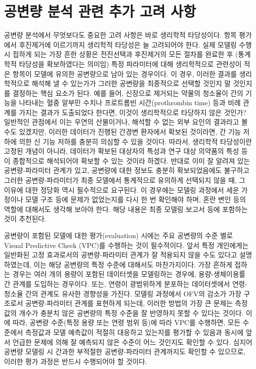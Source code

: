 \documentclass[
  10pt,
  krantz2,
  a4paper]{krantz}
\theoremstyle{definition}
\theoremstyle{definition}
\theoremstyle{definition}
\theoremstyle{remark}
\begin{document}
\hypertarget{uxacf5uxbcc0uxb7c9-uxbd84uxc11d-uxad00uxb828-uxcd94uxac00-uxace0uxb824-uxc0acuxd56d}{%
\section{공변량 분석 관련 추가 고려 사항}\label{uxacf5uxbcc0uxb7c9-uxbd84uxc11d-uxad00uxb828-uxcd94uxac00-uxace0uxb824-uxc0acuxd56d}}

공변량 분석에서 무엇보다도 중요한 고려 사항은 바로 생리학적 타당성이다. 항목 평가에서 후진제거에 이르기까지 생리학적 타당성은 늘 고려되어야 한다. 실제 모델링 수행 시 접하게 되는 가장 흔한 상황은 전진선택과 후진제거의 모든 절차를 완료한 후 (통계학적 타당성을 확보하였다는 의미임) 특정 파라미터에 대해 생리학적으로 관련성이 적은 항목이 모델에 유의한 공변량으로 남아 있는 경우이다. 이 경우, 이러한 결과를 생리학적으로 해석해 낼 수 있는가가 그러한 공변량을 최종적으로 선택할 것인지 말 것인지를 결정하는 핵심 요소가 된다. 예를 들어, 신장으로 제거되는 약물의 청소율이 간의 기능을 나타내는 혈중 알부민 수치나 프로트롬빈 시간(prothrombin time) 등과 비례 관계를 가지는 결과가 도출되었다 한다면, 이것이 생리학적으로 타당하지 않은 것인가? 일반적인 관점에서 이는 우연의 산물이거나, 해석할 수 없는 외부 요인의 결과라고 볼 수도 있겠지만, 이러한 데이터가 진행된 간경변 환자에서 확보된 것이라면, 간 기능 저하에 의한 신 기능 저하를 충분히 의심할 수 있을 것이다. 따라서, 생리학적 타당성이란 고정된 개념이 아니라, 데이터가 확보된 대상자의 특성과 연구 대상 의약품의 특성 등이 종합적으로 해석되어야 확보할 수 있는 것이라 하겠다. 반대로 이미 잘 알려져 있는 공변량-파라미터 관계가 있고, 공변량에 대한 정보도 충분히 확보되었음에도 불구하고 그러한 공변량-파라미터가 최종 모델에서 통계적으로 유의하게 선택되지 않을 때, 그 이유에 대한 정당화 역시 필수적으로 요구된다. 이 경우에는 모델링 과정에서 세운 가정이나 모델 구조 등에 문제가 없었는지를 다시 한 번 확인해야 하며, 혼란 변인 등의 역할에 대해서도 생각해 보아야 한다. 해당 내용은 최종 모델링 보고서 등에 포함하는 것이 추천된다.

공변량이 포함된 모델에 대한 평가(evaluation) 시에는 주요 공변량의 수준 별로 Visual Predictive Check (VPC)를 수행하는 것이 필수적이다. 앞서 특정 개인에게는 일반화된 고정 효과로서의 공변량-파라미터 관계가 잘 적용되지 않을 수도 있다고 설명하였는데, 이는 해당 공변량의 특정 수준에 대해서도 마찬가지이다. 가장 흔하게 접하는 경우는 여러 개의 용량이 포함된 데이터셋을 모델링하는 경우에, 용량-생체이용률 간 관계를 도입하는 경우이다. 또는, 연령이 광범위하게 분포하는 데이터셋에서 연령-청소율 간의 관계도 유사한 경향성을 가진다. 모델링 과정에서 OFV의 감소가 가장 구조로서 공변량-파라미터 관계를 표현하게 되는데, 이러한 방법의 가장 큰 문제는 측정값의 개수가 충분치 않은 공변량의 특정 수준을 잘 반영하지 못할 수 있다는 것이다. 이에 따라, 공변량 수준(특정 용량 또는 연령 범위 등)에 따라 VPC를 수행하면, 모든 수준에서 측정값과 모델 예측값이 적절히 대응하고 있는지를 평가할 수 있음과 동시에 앞서 언급한 문제에 의해 잘 예측되지 않은 수준이 어느 것인지도 확인할 수 있다. 심지어 공변량 모델링 시 간과한 부적절한 공변량-파라미터 관계까지도 확인할 수 있으므로, 이러한 평가 과정은 반드시 수행되어야 할 것이다.
\end{document}
